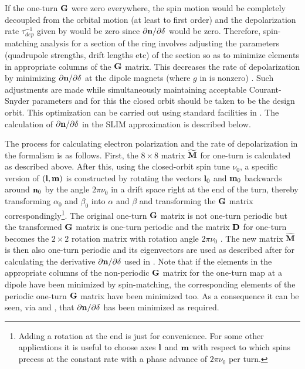 If the one-turn ${\bf G}$ were zero everywhere, the spin motion would be completely decoupled from the
orbital motion (at least to first order) and the depolarization rate $\tau_{dep}^{-1}$ given by
 would be zero since $\partial{\bf n} / \partial\delta$ would be zero. Therefore,
spin-matching analysis for a section of the ring involves adjusting the parameters (quadrupole
strengths, drift lengths etc) of the section so as to minimize elements in appropriate columns of
the ${\bf G}$ matrix. This decreases the rate of depolarization by minimizing
$\partial{\bf n}/\partial\delta$ at the dipole magnets (where $g$ in  is nonzero)
\cite{b:barber99}. Such adjustments are made while simultaneously maintaining acceptable
Courant-Snyder parameters and for this the closed orbit should be taken to be the design orbit.
This optimization can be carried out using standard facilities in \bmad. The calculation of
$\partial{\bf n}/\partial\delta$ in the SLIM approximation is described below.

The process for calculating electron polarization and the rate of depolarization in the 
formalism is as follows. First, the $8 \times 8$ matrix $\widetilde{{\bf M}}$ for one-turn is calculated
as described above. After this, using the closed-orbit spin tune $\nu_0$, a specific version of
$({\bf l}, {\bf m})$ is constructed by rotating the vectors ${\bf l}_0$ and ${\bf m}_0$ backwards around
${\bf n}_0$ by the angle $2\pi \nu_0$ in a drift space right at the end of the turn, thereby
transforming $\alpha_0$ and $\beta_0$ into $\alpha$ and $\beta$ and transforming the ${\bf G}$ matrix
correspondingly\footnote{Adding a rotation at the end is just for convenience. For some other
applications it is useful to choose axes ${\bf l}$ and ${\bf m}$ with respect to which spins precess at
the constant rate with a phase advance of $2\pi \nu_0$ per turn.}. The original one-turn ${\bf G}$
matrix is not one-turn periodic but the transformed ${\bf G}$ matrix is one-turn periodic and the
matrix ${\bf D}$ for one-turn becomes the $2 \times 2$ rotation matrix with rotation angle $2\pi \nu_0$
\cite{b:chao.spin}. The new matrix $\widetilde {{\bf M}}$ is then also one-turn periodic and its
eigenvectors are used as described after  for calculating the derivative ${\partial
{\bf n}}/\partial \delta$ used in . Note that if the elements in the appropriate columns of
the non-periodic ${\bf G}$ matrix for the one-turn map at a dipole have been minimized by
spin-matching, the corresponding elements of the periodic one-turn ${\bf G}$ matrix have been minimized
too. As a consequence it can be seen, via  and , that
$\partial{\bf n}/\partial\delta$ has been minimized as required.

